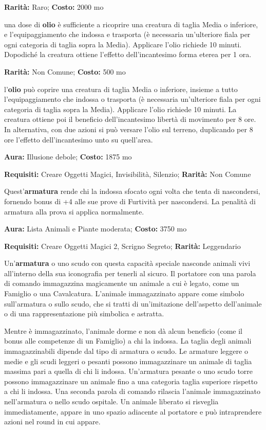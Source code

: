 \begin{multicols}{2}

\textbf{Rarità:} Raro; \textbf{Costo:} 2000 mo

una dose di \textbf{olio} è sufficiente a ricoprire una creatura di taglia Media o inferiore, e l'equipaggiamento che indossa e trasporta (è necessaria un'ulteriore fiala per ogni categoria di taglia sopra la Media). Applicare l'olio richiede 10 minuti. Dopodiché la creatura ottiene l'effetto dell'incantesimo forma eterea per 1 ora.


\textbf{Rarità:} Non Comune; \textbf{Costo:} 500 mo

l'\textbf{olio} può coprire una creatura di taglia Media o inferiore, insieme a tutto l'equipaggiamento che indossa o trasporta (è necessaria un'ulteriore fiala per ogni categoria di taglia sopra la Media). Applicare l'olio richiede 10 minuti. La creatura ottiene poi il beneficio dell'incantesimo libertà di movimento per 8 ore. In alternativa, con due azioni si può versare l'olio sul terreno, duplicando per 8 ore l'effetto dell'incantesimo unto su quell'area.


\textbf{Aura:} Illusione debole; \textbf{Costo:} 1875 mo

\textbf{Requisiti:} Creare Oggetti Magici, Invisibilità, Silenzio; \textbf{Rarità:} Non Comune

Quest'\textbf{armatura} rende chi la indossa sfocato ogni volta che tenta di nascondersi, fornendo bonus di +4 alle sue prove di Furtività per nascondersi. La penalità di armatura alla prova si applica normalmente.


\textbf{Aura:} Lista Animali e Piante moderata; \textbf{Costo:} 3750 mo

\textbf{Requisiti:} Creare Oggetti Magici 2, Scrigno Segreto; \textbf{Rarità:} Leggendario

Un'\textbf{armatura} o uno scudo con questa capacità speciale nasconde animali vivi all'interno della sua iconografia per tenerli al sicuro. Il portatore con una parola di comando immagazzina magicamente un animale a cui è legato, come un Famiglio o una Cavalcatura. L'animale immagazzinato appare come simbolo sull'armatura o sullo scudo, che si tratti di un'imitazione dell'aspetto dell'animale o di una rappresentazione più simbolica e astratta.

Mentre è immagazzinato, l'animale dorme e non dà alcun beneficio (come il bonus alle competenze di un Famiglio) a chi la indossa. La taglia degli animali immagazzinabili dipende dal tipo di armatura o scudo. Le armature leggere o medie e gli scudi leggeri o pesanti possono immagazzinare un animale di taglia massima pari a quella di chi li indossa. Un'armatura pesante o uno scudo torre possono immagazzinare un animale fino a una categoria taglia superiore rispetto a chi li indossa. Una seconda parola di comando rilascia l'animale immagazzinato nell'armatura o nello scudo ospitale. Un animale liberato si risveglia immediatamente, appare in uno spazio adiacente al portatore e può intraprendere azioni nel round in cui appare.


\end{multicols}

